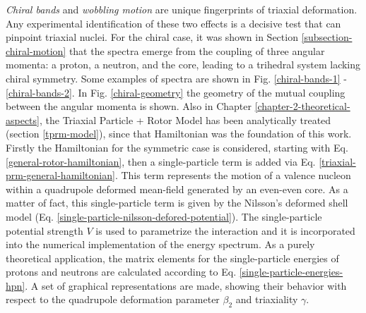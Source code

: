 \emph{Chiral bands} and \emph{wobbling motion} are unique fingerprints of triaxial deformation. Any experimental identification of these two effects is a decisive test that can pinpoint triaxial nuclei. For the chiral case, it was shown in Section \ref{subsection-chiral-motion} that the spectra emerge from the coupling of three angular momenta: a proton, a neutron, and the core, leading to a trihedral system lacking chiral symmetry. Some examples of spectra are shown in Fig. \ref{chiral-bands-1} - \ref{chiral-bands-2}. In Fig. \ref{chiral-geometry} the geometry of the mutual coupling between the angular momenta is shown. Also in Chapter \ref{chapter-2-theoretical-aspects}, the Triaxial Particle + Rotor Model has been analytically treated (section \ref{tprm-model}), since that Hamiltonian was the foundation of this work. Firstly the Hamiltonian for the symmetric case is considered, starting with Eq. \eqref{general-rotor-hamiltonian}, then a single-particle term is added via Eq. \eqref{triaxial-prm-general-hamiltonian}. This term represents the motion of a valence nucleon within a quadrupole deformed mean-field generated by an even-even core. As a matter of fact, this single-particle term is given by the Nilsson's deformed shell model (Eq. \eqref{single-particle-nilsson-defored-potential}). The single-particle potential strength $V$ is used to parametrize the interaction and it is incorporated into the numerical implementation of the energy spectrum. As a purely theoretical application, the matrix elements for the single-particle energies of protons and neutrons are calculated according to Eq. \eqref{single-particle-energies-hpn}. A set of graphical representations are made, showing their behavior with respect to the quadrupole deformation parameter $\beta_2$ and triaxiality $\gamma$. 

